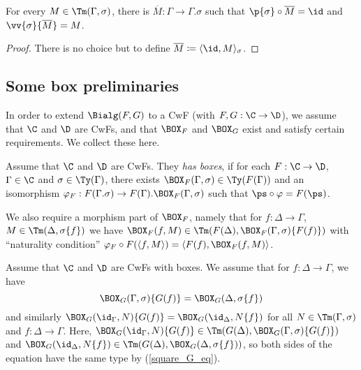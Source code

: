 \documentclass{article}
\newcommand{\isoGR}{\ensuremath{\phi_{G\rightarrow}}}
\newcommand{\isoGL}{\ensuremath{\phi_{G\leftarrow}}}
\begin{document}
\begin{lemma}
  For every $M \in \Tm(\Gamma, \sigma)$, there is $\overline{M} :
  \Gamma \to \Gamma.\sigma$ such that $\p{\sigma} \circ \overline{M} =
  \id$ and $\vv{\sigma}\{\overline{M}\} = M$.
\end{lemma}
\begin{proof}
  There is no choice but to define $\overline{M} \coloneqq \langle \id, M\rangle_{\sigma}$.
\end{proof}

\subsection{Some box preliminaries}

In order to extend $\Bialg(F, G)$ to a CwF (with $F, G : \C \to \D$),
we assume that $\C$ and $\D$ are CwFs, and that $\BOX_F$ and
$\BOX_G$ exist and satisfy certain requirements. We collect these here.

\begin{definition}
  Assume that $\C$ and $\D$ are CwFs. They \emph{has boxes}, if for
  each $F : \C \to \D$, $\Gamma \in \C$ and $\sigma \in \Ty(\Gamma)$,
  there exists $\BOX_F(\Gamma, \sigma) \in \Ty(F(\Gamma))$ and an
  isomorphism $\varphi_F : F(\Gamma.\sigma) \to F(\Gamma).\BOX_F(\Gamma, \sigma)$
  such that $\ps \circ \varphi = F(\ps)$.

  We also require a morphism part of $\BOX_F$, namely that
  for $f : \Delta \to \Gamma$, $M \in \Tm(\Delta, \sigma\{f\})$ we
  have $\BOX_F(f, M) \in \Tm(F(\Delta), \BOX_F(\Gamma,
  \sigma)\{F(f)\})$ with ``naturality condition'' $\varphi_F \circ
  F(\langle f , M\rangle) = \langle F(f), \BOX_F(f, M)\rangle$.
\end{definition}


Assume that $\C$ and $\D$ are CwFs with boxes. We assume that for $f :
\Delta \to \Gamma$, we have
 \begin{equation} \label{square_G_eq}
 \BOX_G(\Gamma, \sigma)\{G(f)\} = \BOX_G(\Delta, \sigma\{f\})
 \end{equation}
 and similarly $\BOX_G(\id_{\Gamma}, N)\{G(f)\} =
 \BOX_G(\id_{\Delta}, N\{f\})$ for all $N \in \Tm(\Gamma, \sigma)$
 and $f : \Delta \to \Gamma$. Here, $\BOX_G(\id_{\Gamma},
 N)\{G(f)\} \in \Tm(G(\Delta), \BOX_G(\Gamma, \sigma)\{G(f)\})$ and
 $\BOX_G(\id_{\Delta}, N\{f\}) \in \Tm(G(\Delta), \BOX_G(\Delta,
 \sigma\{f\}))$, so both sides of the equation have the same type by
 (\ref{square_G_eq}).
\end{document}
